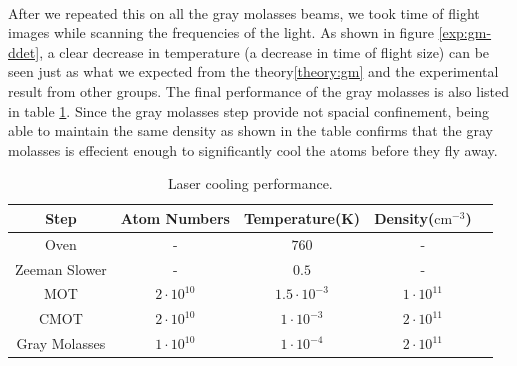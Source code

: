 \\
After we repeated this on all the gray molasses beams, we took time of flight images while scanning the frequencies of the light. As shown in figure \ref{exp:gm-ddet}, a clear decrease in temperature (a decrease in time of flight size) can be seen just as what we expected from the theory\ref{theory:gm} and the experimental result from other groups\cite{gm-theory}. The final performance of the gray molasses is also listed in table \ref{exp:laser-cooling}. Since the gray molasses step provide not spacial confinement, being able to maintain the same density as shown in the table confirms that the gray molasses is effecient enough to significantly cool the atoms before they fly away.
\begin{table}
  \begin{center}
    \begin{tabular}{|c|c|c|c|c|}\hline
      Step&Atom Numbers&Temperature(K)&Density($\text{cm}^{-3}$)\\\hline
      Oven&-&$760$&-\\\hline
      Zeeman Slower&-&$0.5$&-\\\hline
      MOT&$2\cdot10^{10}$&$1.5\cdot10^{-3}$&$1\cdot10^{11}$\\\hline
      CMOT&$2\cdot10^{10}$&$1\cdot10^{-3}$&$2\cdot10^{11}$\\\hline
      Gray Molasses&$1\cdot10^{10}$&$1\cdot10^{-4}$&$2\cdot10^{11}$\\\hline
    \end{tabular}
  \end{center}
  \caption{Laser cooling performance.}
  \label{exp:laser-cooling}
\end{table}

